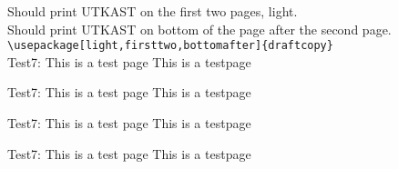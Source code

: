 \documentclass[a4paper,norsk]{article}
\newcommand{\xx}{
Test7: This is a test page \thepage \vfill
This is a testpage \thepage \newpage
}
\begin{document}
Should print UTKAST on the first two pages, light.\\
Should print UTKAST on bottom of the page after the second page.\\
\verb|\usepackage[light,firsttwo,bottomafter]{draftcopy}|\\
\xx\xx\xx\xx
\end{document}
